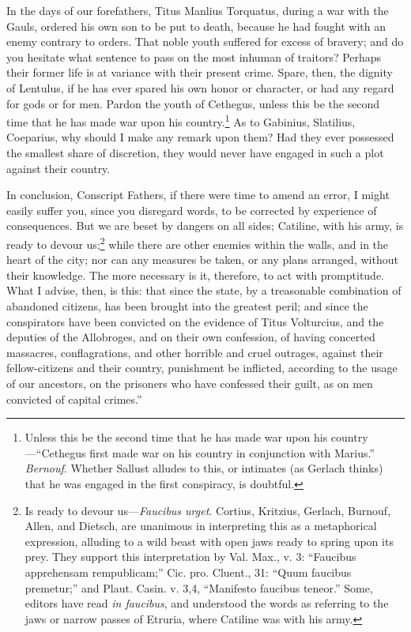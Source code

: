 In the days of our forefathers, Titus Manlius Torquatus, during a war
with the Gauls, ordered his own son to be put to death, because he had
fought with an enemy contrary to orders. That noble youth suffered for
excess of bravery; and do you hesitate what sentence to pass on the
most inhuman of traitors? Perhaps their former life is at variance
with their present crime. Spare, then, the dignity of Lentulus, if he
has ever spared his own honor or character, or had any regard for gods
or for men. Pardon the youth of Cethegus, unless this be the second
time that he has made war upon his country.\footnote{Unless this be the second time that he has made war upon
his country—``Cethegus first made war on his country in conjunction
with Marius.'' \emph{Bernouf}. Whether Sallust alludes to this, or intimates
(as Gerlach thinks) that he was engaged in the first conspiracy, is
doubtful.} As to Gabinius,
Slatilius, Coeparius, why should I make any remark upon them? Had they
ever possessed the smallest share of discretion, they would never have
engaged in such a plot against their country.

In conclusion, Conscript Fathers, if there were time to amend an
error, I might easily suffer you, since you disregard words, to be
corrected by experience of consequences. But we are beset by dangers on
all sides; Catiline, with his army, is ready to devour us;\footnote{Is ready to devour us—\emph{Faucibus urget}. Cortius, Kritzius,
Gerlach, Burnouf, Allen, and Dietsch, are unanimous in interpreting
this as a metaphorical expression, alluding to a wild beast with open
jaws ready to spring upon its prey. They support this interpretation
by Val. Max., v. 3: ``Faucibus apprehensam rempublicam;'' Cic. pro.
Cluent., 31: ``Quum faucibus premetur;'' and Plaut. Casin. v. 3,4,
``Manifesto faucibus teneor.'' Some, editors have read \emph{in faucibus},
and understood the words as referring to the jaws or narrow passes of
Etruria, where Catiline was with his army.} while
there are other enemies within the walls, and in the heart of the
city; nor can any measures be taken, or any plans arranged, without
their knowledge. The more necessary is it, therefore, to act with
promptitude. What I advise, then, is this: that since the state, by a
treasonable combination of abandoned citizens, has been brought into
the greatest peril; and since the conspirators have been convicted on
the evidence of Titus Volturcius, and the deputies of the Allobroges,
and on their own confession, of having concerted massacres,
conflagrations, and other horrible and cruel outrages, against their
fellow-citizens and their country, punishment be inflicted, according
to the usage of our ancestors, on the prisoners who have confessed
their guilt, as on men convicted of capital crimes.''

